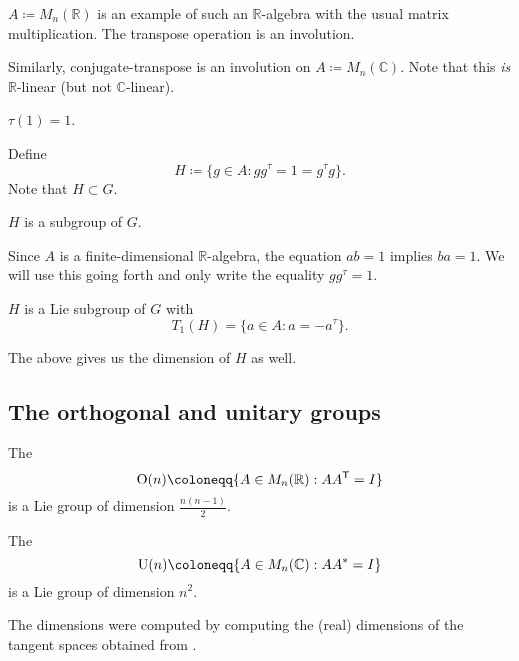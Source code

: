 \documentclass[12pt]{article}
\begin{document}
\begin{ex}
	$A \coloneqq M_{n}(\mathbb{R})$ is an example of such an $\mathbb{R}$-algebra with the usual matrix multiplication. \newline
	The transpose operation is an involution.

	Similarly, conjugate-transpose is an involution on $A \coloneqq M_{n}(\mathbb{C})$. Note that this \emph{is} $\mathbb{R}$-linear (but not $\mathbb{C}$-linear).
\end{ex}

\begin{lem}
	$\tau(1) = 1$.
\end{lem}

Define
\begin{equation*} 
	H \coloneqq \{g \in A : g g^{\tau} = 1 = g^{\tau} g\}.
\end{equation*}
Note that $H \subset G$.

\begin{lem}
	$H$ is a subgroup of $G$.
\end{lem}

\begin{rem}
	Since $A$ is a finite-dimensional $\mathbb{R}$-algebra, the equation $ab = 1$ implies $ba = 1$. 
	We will use this going forth and only write the equality $gg^{\tau} = 1$.
\end{rem}

\begin{thm} \label{thm:involution-subgroup-tangent-space}
	$H$ is a Lie subgroup of $G$ with
	\begin{equation*} 
		T_{1}(H) = \{a \in A : a = -a^{\tau}\}.
	\end{equation*}
\end{thm}
The above gives us the dimension of $H$ as well.

\subsection{The orthogonal and unitary groups}

\begin{ex} \label{ex:orthogonal-unitary-groups-dimensions}
	The 
	\begin{equation*} 
		\OO(n) \coloneqq \{A \in M_{n}(\mathbb{R}) : A A^{\trans} = I\}
	\end{equation*}
	is a Lie group of dimension $\frac{n(n - 1)}{2}$.

	The 
	\begin{equation*} 
		\UU(n) \coloneqq \{A \in M_{n}(\mathbb{C}) : A A^{\ast} = I\}
	\end{equation*}
	is a Lie group of dimension $n^{2}$.

	The dimensions were computed by computing the (real) dimensions of the tangent spaces obtained from .
\end{ex}
\end{document}
